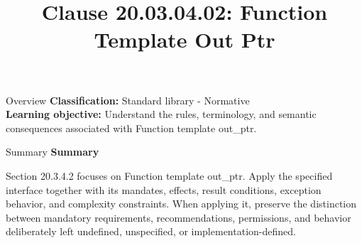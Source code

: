 \documentclass[10pt,letterpaper]{article}
\title{Clause 20.03.04.02: Function Template Out Ptr}
\author{}
\date{}
\begin{document}
\maketitle
\begin{CornellOverviewBox}{Overview}
\textbf{Classification:} Standard library - Normative\\[2pt]
\textbf{Learning objective:} Understand the rules, terminology, and semantic consequences associated with Function template out\_ptr.
\end{CornellOverviewBox}\begin{CornellSummaryBox}{Summary}
{\sffamily\bfseries\color{Accent} Summary}\par\vspace{3pt}Section 20.3.4.2 focuses on Function template out\_ptr. Apply the specified interface together with its mandates, effects, result conditions, exception behavior, and complexity constraints. When applying it, preserve the distinction between mandatory requirements, recommendations, permissions, and behavior deliberately left undefined, unspecified, or implementation-defined.
\end{CornellSummaryBox}
\end{document}
